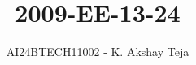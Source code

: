\documentclass[journal,9pt,onecolumn]{IEEEtran}
\begin{document}

\vspace{3cm}
\title{2009-EE-13-24}
\author{AI24BTECH11002 - K. Akshay Teja}
\maketitle
 \bigskip
{\let\newpage\relax\maketitle}

\renewcommand{\thefigure}{\theenumi}
\renewcommand{\thetable}{\theenumi}
\setlength{\intextsep}{10pt} %

\renewcommand{\thetable}{\theenumi}
\end{document}
